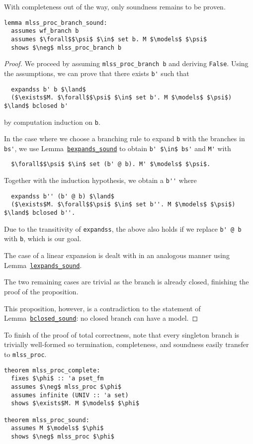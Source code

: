 \documentclass[sigplan,10pt,anonymous,review]{acmart}
\begin{document}
\noindent With completeness out of the way, only soundness remains to be proven. 
\begin{lstlisting}[belowskip=0pt]
lemma mlss_proc_branch_sound:
  assumes wf_branch b
  assumes $\forall$$\psi$ $\in$ set b. M $\models$ $\psi$
  shows $\neg$ mlss_proc_branch b
\end{lstlisting}
\begin{proof}
  We proceed by assuming \lstinline!mlss_proc_branch b! and deriving \lstinline!False!.
  Using the assumptions, we can prove that there exists \lstinline!b'! such that
\begin{lstlisting}
  expandss b' b $\land$
  ($\exists$M. $\forall$$\psi$ $\in$ set b'. M $\models$ $\psi$) $\land$ bclosed b'
\end{lstlisting}
  by computation induction on \lstinline!b!.

  In the case where we choose a branching rule to expand \lstinline!b! with the branches in \lstinline!bs'!, we use Lemma~\hyperref[lst:lexpands_sound]{\lstinline!bexpands_sound!} to obtain \lstinline!b' $\in$ bs'! and \lstinline!M'! with
\begin{lstlisting}
  $\forall$$\psi$ $\in$ set (b' @ b). M' $\models$ $\psi$.
\end{lstlisting}
  Together with the induction hypothesis, we obtain a \lstinline!b''! where 
\begin{lstlisting}
  expandss b'' (b' @ b) $\land$
  ($\exists$M. $\forall$$\psi$ $\in$ set b''. M $\models$ $\psi$) $\land$ bclosed b''.
\end{lstlisting}
  Due to the transitivity of \lstinline!expandss!, the above also holds if we replace \lstinline!b' @ b! with \lstinline!b!, which is our goal.

  The case of a linear expansion is dealt with in an analogous manner using Lemma~\hyperref[lst:lexpands_sound]{\lstinline!lexpands_sound!}.

  The two remaining cases are trivial as the branch is already closed, finishing the proof of the proposition.

  This proposition, however, is a contradiction to the statement of Lemma~\hyperref[lst:bclosed_sound]{\lstinline!bclosed_sound!}: no closed branch can have a model. 
\end{proof}

\noindent To finish of the proof of total correctness, note that every singleton branch is trivially well-formed so termination, completeness, and soundness easily transfer to \lstinline!mlss_proc!.
\begin{lstlisting}
theorem mlss_proc_complete:
  fixes $\phi$ :: 'a pset_fm
  assumes $\neg$ mlss_proc $\phi$
  assumes infinite (UNIV :: 'a set)
  shows $\exists$M. M $\models$ $\phi$

theorem mlss_proc_sound:
  assumes M $\models$ $\phi$
  shows $\neg$ mlss_proc $\phi$
\end{lstlisting}
\end{document}

